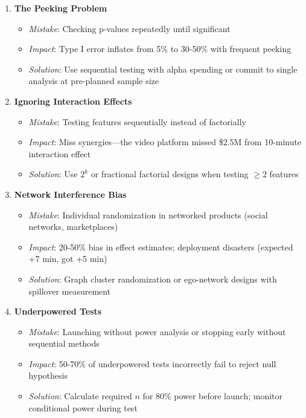 \begin{enumerate}
    \item \textbf{The Peeking Problem}
    \begin{itemize}
        \item \textit{Mistake}: Checking p-values repeatedly until significant
        \item \textit{Impact}: Type I error inflates from 5\% to 30-50\% with frequent peeking
        \item \textit{Solution}: Use sequential testing with alpha spending or commit to single analysis at pre-planned sample size
    \end{itemize}

    \item \textbf{Ignoring Interaction Effects}
    \begin{itemize}
        \item \textit{Mistake}: Testing features sequentially instead of factorially
        \item \textit{Impact}: Miss synergies---the video platform missed \$2.5M from 10-minute interaction effect
        \item \textit{Solution}: Use $2^k$ or fractional factorial designs when testing $\geq 2$ features
    \end{itemize}

    \item \textbf{Network Interference Bias}
    \begin{itemize}
        \item \textit{Mistake}: Individual randomization in networked products (social networks, marketplaces)
        \item \textit{Impact}: 20-50\% bias in effect estimates; deployment disasters (expected +7 min, got +5 min)
        \item \textit{Solution}: Graph cluster randomization or ego-network designs with spillover measurement
    \end{itemize}

    \item \textbf{Underpowered Tests}
    \begin{itemize}
        \item \textit{Mistake}: Launching without power analysis or stopping early without sequential methods
        \item \textit{Impact}: 50-70\% of underpowered tests incorrectly fail to reject null hypothesis
        \item \textit{Solution}: Calculate required $n$ for 80\% power before launch; monitor conditional power during test
    \end{itemize}


\end{enumerate}
